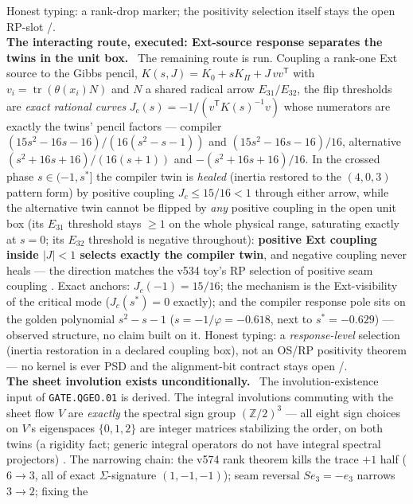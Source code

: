 \documentclass[11pt,a4paper]{article}
\theoremstyle{definition}
\begin{document}
\begin{winbox}
Honest typing: a rank-drop marker; the positivity selection itself stays the open RP-slot
\mE/\mO.
\smallskip\\
\noindent\textbf{The interacting route, executed: Ext-source response separates the twins in
the unit box.} \ The remaining route is run.  Coupling a
rank-one Ext source to the Gibbs pencil, $K(s,J)=K_0+sK_\Pi+J\,vv^{\mathsf T}$ with
$v_i=\operatorname{tr}(\theta(x_i)N)$ and $N$ a shared radical arrow $E_{31}/E_{32}$, the flip
thresholds are \emph{exact rational curves} $J_c(s)=-1/(v^{\mathsf T}K(s)^{-1}v)$ whose
numerators are exactly the twins' pencil factors --- compiler
$(15s^2{-}16s{-}16)/(16(s^2{-}s{-}1))$ and $(15s^2{-}16s{-}16)/16$, alternative
$(s^2{+}16s{+}16)/(16(s{+}1))$ and $-(s^2{+}16s{+}16)/16$.  In the crossed phase
$s\in(-1,s^*]$ the compiler twin is \emph{healed} (inertia restored to the $(4,0,3)$ pattern
form) by positive coupling $J_c\le 15/16<1$ through either arrow, while the alternative twin
cannot be flipped by \emph{any} positive coupling in the open unit box (its $E_{31}$ threshold
stays $\ge1$ on the whole physical range, saturating exactly at $s=0$; its $E_{32}$ threshold
is negative throughout): \textbf{positive Ext coupling inside $|J|<1$ selects exactly the
compiler twin}, and negative coupling never heals --- the direction matches the v534 toy's RP
selection of positive seam coupling \mE.  Exact anchors: $J_c(-1)=15/16$; the mechanism is the
Ext-visibility of the critical mode ($J_c(s^*)=0$ exactly); and the compiler response pole
sits on the golden polynomial $s^2-s-1$ ($s=-1/\varphi=-0.618$, next to $s^*=-0.629$) ---
observed structure, no claim built on it.  Honest typing: a \emph{response-level} selection
(inertia restoration in a declared coupling box), not an OS/RP positivity theorem --- no
kernel is ever PSD and the alignment-bit contract stays open \mE/\mC.
\smallskip\\
\noindent\textbf{The sheet involution exists unconditionally.}
\ The involution-existence input of
\texttt{GATE.QGEO.01} is derived.  The integral involutions commuting
with the sheet flow $V$ are \emph{exactly} the spectral sign group
$(\mathbb{Z}/2)^3$ --- all eight sign choices on $V$'s eigenspaces
$\{0,1,2\}$ are integer matrices stabilizing the order, on both twins
(a rigidity fact; generic integral operators do not have integral
spectral projectors) \mE.  The narrowing chain: the v574 rank theorem
kills the trace $+1$ half ($6\to3$, all of exact $\Sigma$-signature
$(1,-1,-1)$); seam reversal $Se_3=-e_3$ narrows $3\to2$; fixing the

\end{winbox}
\end{document}
